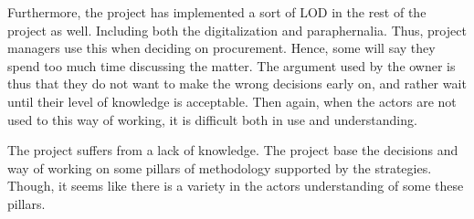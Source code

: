Furthermore, the project has implemented a sort of LOD in the rest of the project as well. Including both the digitalization and paraphernalia. Thus, project managers use this when deciding on procurement. Hence, some will say they spend too much time discussing the matter. The argument used by the owner is thus that they do not want to make the wrong decisions early on, and rather wait until their level of knowledge is acceptable. Then again, when the actors are not used to this way of working, it is difficult both in use and understanding.

The project suffers from a lack of knowledge. The project base the decisions and way of working on some pillars of methodology supported by the strategies. Though, it seems like there is a variety in the actors understanding of some these pillars. 
\cleardoublepage